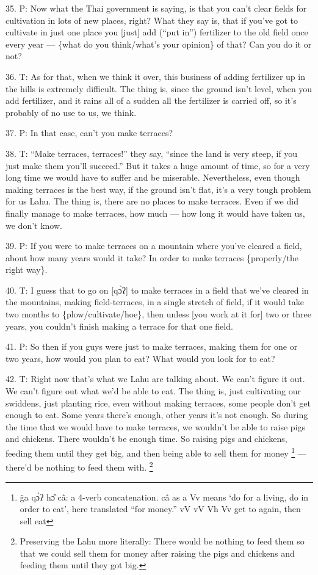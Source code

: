 35. P: Now what the Thai government is saying, is that you can't clear fields for
cultivation in lots of new places, right? What they say is, that if you've got
to cultivate in just one place you [just] add (``put in'') fertilizer to the old
field once every year --- \{what do you think/what's your opinion\} of that? Can
you do it or not?

36. T: As for that, when we think it over, this business of adding fertilizer up
in the hills is extremely difficult. The thing is, since the ground isn't level,
when you add fertilizer, and it rains all of a sudden all the fertilizer is carried
off, so it's probably of no use to us, we think.

37. P: In that case, can't you make terraces?

38. T: ``Make terraces, terraces!'' they say, ``since the land is very steep, if
you just make them you'll succeed.'' But it takes a huge amount of time, so for
a very long time we would have to suffer and be miserable. Nevertheless, even though
making terraces is the best way, if the ground isn't flat, it's a very tough problem
for us Lahu. The thing is, there are no places to make terraces. Even if we did
finally manage to make terraces, how much --- how long it would have taken us,
we don't know.

39. P: If you were to make terraces on a mountain where you've cleared a field,
about how many years would it take? In order to make terraces \{properly/the right
way\}.

40. T: I guess that to go on [qɔ̀ʔ] to make terraces in a field that we've cleared
in the mountains, making field-terraces, in a single stretch of field, if it would
take two months to \{plow/cultivate/hoe\}, then unless [you work at it for] two
or three years, you couldn't finish making a terrace for that one field.

41. P: So then if you guys were just to make terraces, making them for one or two
years, how would you plan to eat? What would you look for to eat?

42. T: Right now that's what we Lahu are talking about. We can't figure it out.
We can't figure out what we'd be able to eat. The thing is, just cultivating our
swiddens, just planting rice, even without making terraces, some people don't get
enough to eat. Some years there's enough, other years it's not enough. So during
the time that we would have to make terraces, we wouldn't be able to raise pigs
and chickens. There wouldn't be enough time. So raising pigs and chickens, feeding
them until they get big, and then being able to sell them for money \footnote{g̈a qɔ̀ʔ hɔ̂ câ: a 4-verb concatenation. câ as a Vv means `do for a living, do in order to eat', here translated ``for money.''  vV vV Vh Vv  get to again, then sell eat} --- there'd
be nothing to feed them with. \footnote{Preserving the Lahu more literally: There would be nothing to feed them so that we could sell them for money after raising the pigs and chickens and feeding them until they got big.}

